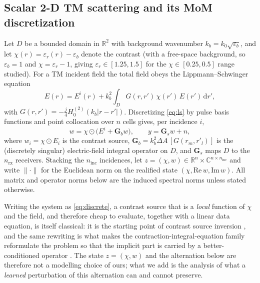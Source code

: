 \documentclass[journal,cmes,article,submit,moreauthors,pdftex]{Definitions/tsp}
\newcommand{\R}{\mathbb{R}}
\newcommand{\C}{\mathbb{C}}
\newcommand{\norm}[1]{\lVert #1 \rVert}
\begin{document}
\subsection{Scalar 2-D TM scattering and its MoM discretization}
Let $D$ be a bounded domain in $\R^2$ with background wavenumber $k_b=k_0\sqrt{\varepsilon_b}$,
and let $\chi(r)=\varepsilon_r(r)-\varepsilon_b$ denote the contrast (with a free-space background,
so $\varepsilon_b=1$ and $\chi=\varepsilon_r-1$, giving $\varepsilon_r\in[1.25,1.5]$ for the
$\chi\in[0.25,0.5]$ range studied). For a TM incident field the
total field obeys the Lippmann--Schwinger equation
\begin{equation}\label{eq:ls}
E(r) = E^{i}(r) + k_b^2\!\int_D G(r,r')\,\chi(r')\,E(r')\,\mathrm{d}r',
\end{equation}
with $G(r,r')=-\tfrac{j}{4}H_0^{(2)}(k_b|r-r'|)$. Discretizing \eqref{eq:ls} by pulse basis
functions and point collocation over $n$ cells gives, per incidence $i$,
\begin{equation}\label{eq:discrete}
w = \chi\odot\big(E^i + \mathbf{G}_b w\big),\qquad
y = \mathbf{G}_s w + n,
\end{equation}
where $w_i=\chi\odot E_i$ is the contrast source, $\mathbf{G}_b=k_b^2\Delta A\,
[G(r_m,r'_l)]$ is the (discretely singular) electric-field integral operator on $D$, and
$\mathbf{G}_s$ maps $D$ to the $n_{\mathrm{rx}}$ receivers. Stacking the $n_{\mathrm{inc}}$
incidences, let $z=(\chi,w)\in\R^n\times\C^{n\times n_{\mathrm{inc}}}$ and write
$\norm{\cdot}$ for the Euclidean norm on the realified state
$(\chi,\mathrm{Re}\,w,\mathrm{Im}\,w)$. All matrix and operator norms below are the
induced spectral norms unless stated otherwise.

Writing the system as \eqref{eq:discrete}, a contrast source that is a \emph{local} function of $\chi$ and the field, and therefore cheap to evaluate, together with a linear data equation, is itself
classical: it is the starting point of contrast source inversion \cite{csi_lit}, and the same
rewriting is what makes the contraction-integral-equation family reformulate the problem so that
the implicit part is carried by a better-conditioned operator \cite{cie_lit}. The state
$z=(\chi,w)$ and the alternation below are therefore not a modelling choice of ours; what we
add is the analysis of what a \emph{learned} perturbation of this alternation can and cannot
preserve.
\end{document}
